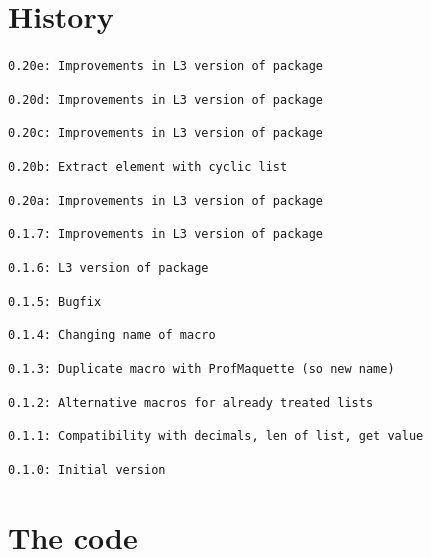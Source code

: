 \documentclass[11pt,a4paper]{ltxdoc}
\begin{document}
\pagebreak

\section{History}

\texttt{0.20e: Improvements in L3 version of package}

\texttt{0.20d: Improvements in L3 version of package}

\texttt{0.20c: Improvements in L3 version of package}

\texttt{0.20b: Extract element with cyclic list}

\texttt{0.20a: Improvements in L3 version of package}

\texttt{0.1.7: Improvements in L3 version of package}

\texttt{0.1.6: L3 version of package}

\texttt{0.1.5: Bugfix}

\texttt{0.1.4: Changing name of macro}

\texttt{0.1.3: Duplicate macro with ProfMaquette (so new name)}

\texttt{0.1.2: Alternative macros for already treated lists}

\texttt{0.1.1: Compatibility with decimals, len of list, get value}

\texttt{0.1.0: Initial version}

\section{The code}

\end{document}
